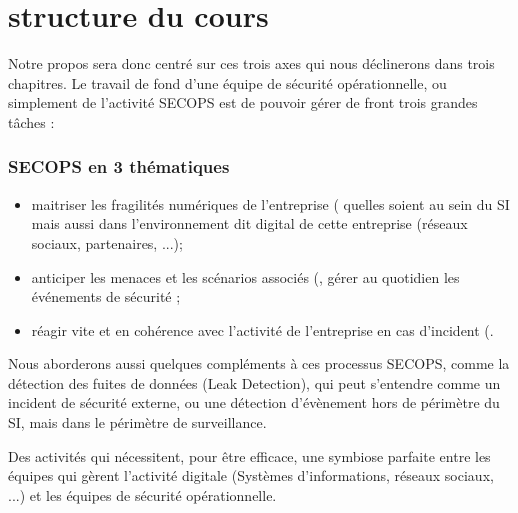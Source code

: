 \newpage
\section{structure du cours}


Notre propos sera donc centré sur ces trois axes  qui nous déclinerons dans trois chapitres. Le travail de fond d'une équipe de sécurité opérationnelle, ou simplement de l'activité SECOPS est de pouvoir gérer de front trois grandes tâches : 

\begin{frame}
\frametitle<presentation>{SECOPS en 3 thématiques}
\begin{itemize}
 \item maitriser les fragilités numériques de l'entreprise ( quelles soient au sein du SI mais aussi dans l'environnement dit digital de cette entreprise (réseaux sociaux, partenaires, ...);
 \item anticiper les menaces et les scénarios associés (, gérer au quotidien les événements de sécurité ;
 \item réagir vite et en cohérence avec l'activité de l'entreprise en cas d'incident (.
\end{itemize}
\end{frame}

Nous aborderons aussi quelques compléments à ces processus SECOPS, comme la détection des fuites de données (Leak Detection), qui peut s'entendre comme un incident de sécurité externe, ou une détection d'évènement hors de périmètre du SI, mais dans le périmètre de surveillance.


Des activités qui nécessitent, pour être efficace, une symbiose parfaite entre les équipes qui gèrent l'activité digitale (Systèmes d'informations, réseaux sociaux, ...) et les équipes de sécurité opérationnelle.







